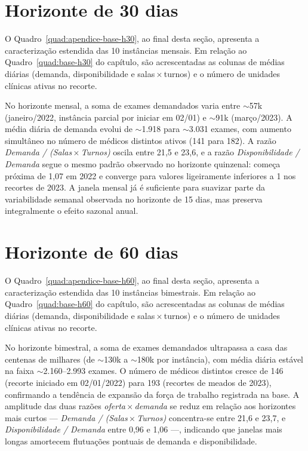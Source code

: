 \clearpage

\section{Horizonte de 30 dias}
\label{apendice:base-h30}

O Quadro~\ref{quad:apendice-base-h30}, ao final desta seção, apresenta a caracterização estendida das 10 instâncias mensais. Em relação ao Quadro~\ref{quad:base-h30} do capítulo, são acrescentadas as colunas de médias diárias (demanda, disponibilidade e salas\,$\times$\,turnos) e o número de unidades clínicas ativas no recorte.

\noindent No horizonte mensal, a soma de exames demandados varia entre $\sim$57k (janeiro/2022, instância parcial por iniciar em 02/01) e $\sim$91k (março/2023). A média diária de demanda evolui de $\sim$1.918 para $\sim$3.031 exames, com aumento simultâneo no número de médicos distintos ativos (141 para 182). A razão \emph{Demanda / (Salas\,$\times$\,Turnos)} oscila entre 21{,}5 e 23{,}6, e a razão \emph{Disponibilidade / Demanda} segue o mesmo padrão observado no horizonte quinzenal: começa próxima de 1{,}07 em 2022 e converge para valores ligeiramente inferiores a 1 nos recortes de 2023. A janela mensal já é suficiente para suavizar parte da variabilidade semanal observada no horizonte de 15 dias, mas preserva integralmente o efeito sazonal anual.

\begingroup\let\cleardoublepage\clearpage
\begin{sidewaysquadro}[p]
	\centering
	\caption{Caracterização estendida das 10 instâncias do horizonte de 30 dias.}
	
	\label{quad:apendice-base-h30}
	\fautor
\end{sidewaysquadro}
\endgroup

\clearpage

\section{Horizonte de 60 dias}
\label{apendice:base-h60}

O Quadro~\ref{quad:apendice-base-h60}, ao final desta seção, apresenta a caracterização estendida das 10 instâncias bimestrais. Em relação ao Quadro~\ref{quad:base-h60} do capítulo, são acrescentadas as colunas de médias diárias (demanda, disponibilidade e salas\,$\times$\,turnos) e o número de unidades clínicas ativas no recorte.

\noindent No horizonte bimestral, a soma de exames demandados ultrapassa a casa das centenas de milhares (de $\sim$130k a $\sim$180k por instância), com média diária estável na faixa $\sim$2.160--2.993 exames. O número de médicos distintos cresce de 146 (recorte iniciado em 02/01/2022) para 193 (recortes de meados de 2023), confirmando a tendência de expansão da força de trabalho registrada na base. A amplitude das duas razões \emph{oferta\,$\times$\,demanda} se reduz em relação aos horizontes mais curtos --- \emph{Demanda / (Salas\,$\times$\,Turnos)} concentra-se entre 21{,}6 e 23{,}7, e \emph{Disponibilidade / Demanda} entre 0{,}96 e 1{,}06 ---, indicando que janelas mais longas amortecem flutuações pontuais de demanda e disponibilidade.

